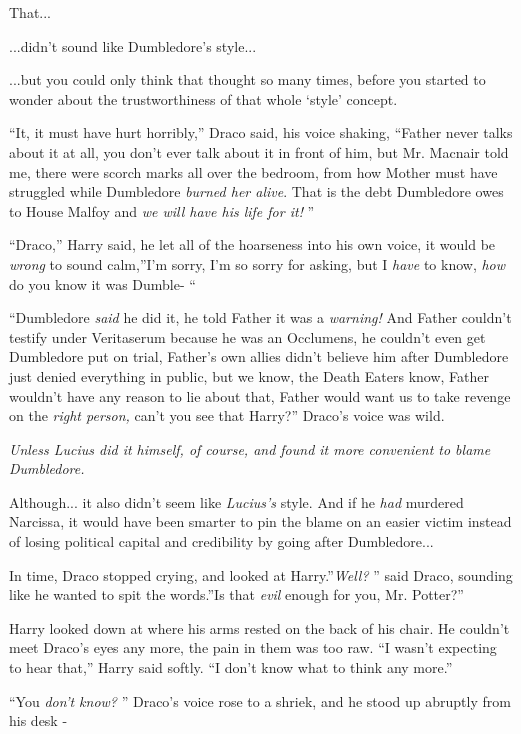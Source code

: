 That...

...didn't sound like Dumbledore's style...

...but you could only think that thought so many times, before you
started to wonder about the trustworthiness of that whole `style'
concept.

``It, it must have hurt horribly,'' Draco said, his voice shaking,
``Father never talks about it at all, you don't ever talk about it in
front of him, but Mr. Macnair told me, there were scorch marks all over
the bedroom, from how Mother must have struggled while Dumbledore
\emph{burned her alive}. That is the debt Dumbledore owes to House
Malfoy and \emph{we will have his life for it!} ''

``Draco,'' Harry said, he let all of the hoarseness into his own voice,
it would be \emph{wrong} to sound calm,''I'm sorry, I'm so sorry for
asking, but I \emph{have} to know, \emph{how} do you know it was Dumble-
``

``Dumbledore \emph{said} he did it, he told Father it was a
\emph{warning!} And Father couldn't testify under Veritaserum because he
was an Occlumens, he couldn't even get Dumbledore put on trial, Father's
own allies didn't believe him after Dumbledore just denied everything in
public, but we know, the Death Eaters know, Father wouldn't have any
reason to lie about that, Father would want us to take revenge on the
\emph{right person,} can't you see that Harry?'' Draco's voice was wild.

\emph{Unless Lucius did it himself, of course, and found it more
convenient to blame Dumbledore.}

Although... it also didn't seem like \emph{Lucius's} style. And if
he \emph{had} murdered Narcissa, it would have been smarter to pin the
blame on an easier victim instead of losing political capital and
credibility by going after Dumbledore...

In time, Draco stopped crying, and looked at Harry.''\emph{Well?} '' said
Draco, sounding like he wanted to spit the words.''Is that \emph{evil}
enough for you, Mr. Potter?''

Harry looked down at where his arms rested on the back of his chair. He
couldn't meet Draco's eyes any more, the pain in them was too raw. ``I
wasn't expecting to hear that,'' Harry said softly. ``I don't know what
to think any more.''

``You \emph{don't know?} '' Draco's voice rose to a shriek, and he stood
up abruptly from his desk -

